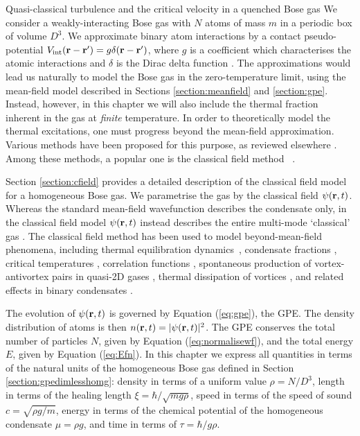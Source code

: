 \begin{chapter}{\label{cha:nonequib}Quasi-classical turbulence and the critical velocity in a quenched Bose gas}
We consider a weakly-interacting Bose gas with $N$ atoms of mass $m$ in a periodic box of volume $D^3$.  We approximate binary atom interactions by a contact pseudo-potential $V_{\mathrm{int}}({\bf r}-{\bf r'})= g \delta({\bf r}-{\bf r'})$, where $g$ is a coefficient which characterises the atomic interactions and $\delta$ is the Dirac delta function \cite{Pethick}. The approximations would lead us naturally to model the Bose gas in the zero-temperature limit, using the mean-field model described in Sections \ref{section:meanfield} and \ref{section:gpe}. Instead, however, in this chapter we will also include the thermal fraction inherent in the gas at {\it finite} temperature. In order to theoretically model the thermal excitations, one must progress beyond the mean-field approximation.
Various methods have been proposed for this purpose, as reviewed elsewhere
\cite{Pol_Rev,Proukakis,griffin2009bose,finite_temp_book,Blakie,berloff_2014}.
Among these methods, a popular one is the classical field method ~\cite{Svis5,Davis,PRL.87.210404,
PhysRevA.66.013603,Davis2,PhysRevLett.95.263901,Pol_Rev}.

Section \ref{section:cfield} provides a detailed description of the classical field model for a homogeneous Bose gas. We parametrise the gas by the classical field $\psi({\bf r},t)$. Whereas the standard mean-field wavefunction describes the condensate only, in the classical field model $\psi({\bf r},t)$ instead describes the entire multi-mode `classical' gas \cite{Proukakis,Blakie}.  The classical field method has been used to model beyond-mean-field phenomena, including thermal equilibration dynamics~\cite{PhysRevA.66.013603,PhysRevLett.95.263901,pattinson_2014,nazarenko_2014}, condensate fractions \cite{Davis}, critical temperatures \cite{Davis2006}, correlation functions \cite{Wright2011}, spontaneous production of vortex-antivortex pairs in quasi-2D gases \cite{Simula}, thermal dissipation of vortices \cite{berloff_2007},  and related effects in binary condensates \cite{Berloff_2006,Salman20091482,pattinson_2014}.

The evolution of $\psi({\bf r},t)$ is governed by Equation (\ref{eq:gpe}), the GPE. The density distribution of atoms is then $n({\bf r},t)=|\psi({\bf r},t)|^2$.
The GPE conserves the total number of particles $N$, given by Equation (\ref{eq:normalisewf}), and the total energy $E$, given by Equation (\ref{eq:Efn}). In this chapter we express all quantities in terms of the natural units of the homogeneous Bose gas defined in Section \ref{section:gpedimlesshomg}:  density in terms of a uniform value $\rho = N/D^3$, length in terms of the healing length $\xi=\hbar/\sqrt{m g \rho}$, speed in terms of the speed of sound $c=\sqrt{\rho g/m}$, energy in terms of the chemical potential of the homogeneous condensate $\mu=\rho g$, and time in terms of $\tau=\hbar / g \rho$.


\end{chapter}
